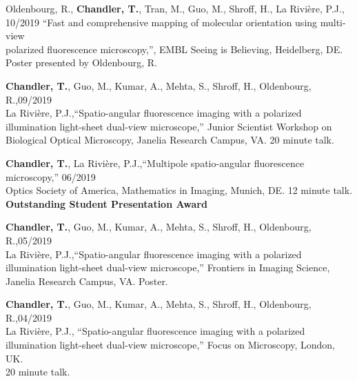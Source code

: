 \documentclass[12pt,letterpaper]{article}
\begin{document}
\begin{benumerate}{10}

\item {Oldenbourg, R., \textbf{Chandler, T.}, Tran, M., Guo, M., Shroff, H., La Rivi\`ere, P.J., \hfill 10/2019 ``Fast and comprehensive mapping of molecular orientation using multi-view\\polarized fluorescence microscopy,'', EMBL Seeing is Believing, Heidelberg, DE.\\ Poster presented by Oldenbourg, R.}
  
\item {\textbf{Chandler, T.}, Guo, M., Kumar, A., Mehta, S., Shroff, H., Oldenbourg, R.,\hfill 09/2019\\ La Rivi\`ere, P.J.,``Spatio-angular fluorescence imaging with a polarized\\ illumination light-sheet dual-view microscope,'' Junior Scientist Workshop on\\ Biological Optical Microscopy, Janelia Research Campus, VA. 20 minute talk.}
  
\item {\textbf{Chandler, T.}, La Rivi\`ere, P.J.,``Multipole spatio-angular fluorescence microscopy,'' \hfill 06/2019\\ Optics Society of America, Mathematics in Imaging, Munich, DE. 12 minute talk.\\ \textbf{Outstanding Student Presentation Award}}
  
\item {\textbf{Chandler, T.}, Guo, M., Kumar, A., Mehta, S., Shroff, H., Oldenbourg, R.,\hfill 05/2019\\ La Rivi\`ere, P.J.,``Spatio-angular fluorescence imaging with a polarized\\ illumination light-sheet dual-view microscope,'' Frontiers in Imaging Science,\\ Janelia Research Campus, VA. Poster.}
  
\item {\textbf{Chandler, T.}, Guo, M., Kumar, A., Mehta, S., Shroff, H., Oldenbourg, R.,\hfill 04/2019\\ La Rivi\`ere, P.J., ``Spatio-angular fluorescence imaging with a polarized\\ illumination light-sheet dual-view microscope,'' Focus on Microscopy, London, UK.\\ 20 minute talk.}
  

\end{benumerate}
\end{document}
